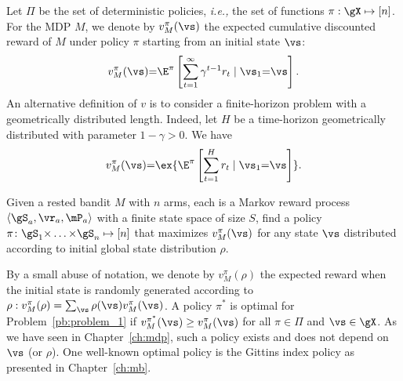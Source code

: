 Let $\Pi$ be the set of deterministic policies, \emph{i.e.,} the set of
functions $\pi:\gX\mapsto[n]$. For the MDP $M$, we denote by
$v_{M}^{\pi}(\vs)$ the expected cumulative discounted reward of ${M}$ under policy $\pi$ starting from an initial state $\vs$:
\[ v_{M}^\pi(\vs) {=}
\E^\pi\left[\sum_{t=1}^{\infty} \gamma^{t-1}r_t \mid \vs_1{=}\vs\right].\]
An alternative definition of $v$ is to consider a finite-horizon problem with a geometrically distributed length. Indeed, let $H$ be a time-horizon geometrically distributed with parameter $1-\gamma>0$. We have
\begin{equation}
    \label{eq:V-vs_R}
    v_{M}^\pi(\vs)  {=} \ex{\E^\pi\left[\sum_{t=1}^{H} r_t \mid \vs_1{=}\vs\right]}.
\end{equation}
\begin{prob}
\label{pb:problem_1}
Given a rested bandit $M$ with $n$ arms, each is a Markov reward process $\langle\gS_a,\vr_a,\mP_a\rangle$ with a finite state space of size $S$, find a policy $\pi\colon\gS_1{\times}\dots{\times}\gS_n\mapsto[n]$ that maximizes $v_{M}^\pi(\vs)$ for any state $\vs$ distributed according to initial global state distribution $\rho$.
\end{prob}

By a small abuse of notation, we denote by $v_M^\pi(\rho)$ the expected reward when the initial state is randomly generated according to $\rho: v_M^\pi(\rho)=\sum_{\vs}\rho(\vs)v_{M}^\pi(\vs)$.
A policy
$\pi^*$ is optimal for Problem~\ref{pb:problem_1} if $ v_{M}^{\pi^*}(\vs) \ge v_{M}^\pi(\vs) $ for all
$\pi\in\Pi$ and $\vs\in\gX$.
As we have seen in Chapter~\ref{ch:mdp},
such a policy exists and does not depend on $\vs$ (or $\rho$). One well-known optimal policy is the Gittins index policy as presented in Chapter~\ref{ch:mb}. 

